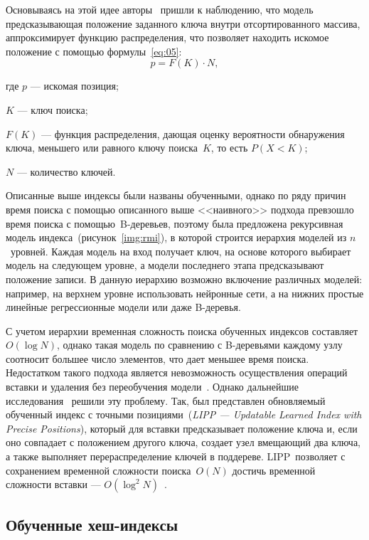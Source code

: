 Основываясь на этой идее авторы~\cite{main} пришли к наблюдению, что модель
предсказывающая положение заданного ключа внутри отсортированного массива,
аппроксимирует функцию распределения, что позволяет находить искомое положение с
помощью формулы~\eqref{eq:05}:
\begin{equation}\label{eq:05}
    p = F(K) \cdot N,
\end{equation}

где $p$ --- искомая позиция;

$K$ --- ключ поиска;

$F(K)$ --- функция распределения, дающая оценку вероятности обнаружения
ключа, меньшего или равного ключу поиска~$K$, то есть $P(X < K)$;

$N$ --- количество ключей.

Описанные выше индексы были названы обученными, однако по ряду
причин~\cite{main} время поиска с помощью описанного выше <<наивного>> подхода
превзошло время поиска с помощью~B-деревьев, поэтому была предложена рекурсивная
модель индекса~(рисунок~\ref{img:rmi}), в которой строится иерархия моделей из
$n$~уровней. Каждая модель на вход получает ключ, на основе которого выбирает
модель на следующем уровне, а модели последнего этапа предсказывают положение
записи. В данную иерархию возможно включение различных моделей: например, на
верхнем уровне использовать нейронные сети, а на нижних простые линейные
регрессионные модели или даже B-деревья. 


С учетом иерархии временная сложность поиска обученных индексов
составляет~$O(\log N)$, однако такая модель по сравнению с B-деревьями каждому
узлу соотносит большее число элементов, что дает меньшее время поиска.
Недостатком такого подхода является невозможность осуществления операций вставки
и удаления без переобучения модели~\cite{ulipp}. Однако дальнейшие
исследования~\cite{alex, apex, ulipp, pgmi} решили эту проблему. Так, был
представлен обновляемый обученный индекс с точными позициями~(\textit{LIPP --- Updatable
Learned Index with Precise Positions}), который для вставки предсказывает
положение ключа и, если оно совпадает с положением другого ключа, создает узел
вмещающий два ключа, а также выполняет перераспределение ключей в поддереве.
LIPP~позволяет с сохранением временной сложности поиска~$O(N)$ достичь
временной сложности вставки --- $O(\log^2 N)$~\cite{ulipp}.

\subsection{Обученные хеш-индексы}

